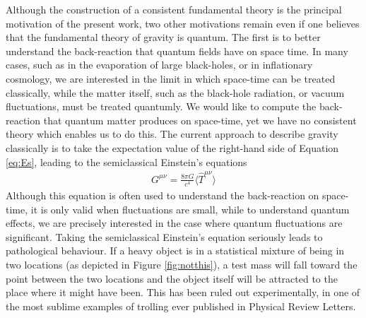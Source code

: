 \documentclass[aps,pra,showpacs,citeautoscript,amsmath,amssymb,floatfix,superscriptaddress,bbm, verbatim,amsfonts,changes,10pt,nofootinbib,longbibliography]{revtex4-1}
\begin{document}
Although the construction of a consistent fundamental theory is the principal motivation of the present work, two other motivations remain even if one believes that the fundamental theory of gravity is quantum. The first is to better understand the back-reaction that quantum fields have on space time. In many cases, such as in the evaporation of large black-holes, or in inflationary cosmology, we are interested in the limit in which space-time can be treated classically, while the matter itself, such as the black-hole radiation, or vacuum fluctuations, must be treated quantumly. We would like to compute the back-reaction that quantum matter produces on space-time, yet we have no consistent theory which enables us to do this. The current approach to describe gravity classically is to take the expectation value of the right-hand side of Equation \eqref{eq:Es}, leading to the  semiclassical Einstein's %
equations\cite{sato1950attempt,moller1962energy,rosenfeld1963quantization}
\begin{align}
G^{\mu\nu}
=\frac{8\pi G}{c^4}\langle{\hat T}^{\mu\nu}\rangle
\label{eq:semi}
\end{align}
Although this equation is often used to understand the back-reaction on space-time, it is only valid when fluctuations are small, while to understand quantum effects, we are precisely interested in the case where quantum fluctuations are significant. 
Taking the semiclassical Einstein's equation seriously leads to pathological behaviour. If a heavy object is in a statistical mixture of being in two locations (as depicted in Figure \ref{fig:notthis}), a test mass will fall toward the point between the two locations and the object itself will be attracted to the place where it might have been. This has been ruled out experimentally, in one of the most sublime  examples of trolling ever published in Physical Review Letters\cite{page1981indirect}. %
\end{document}
